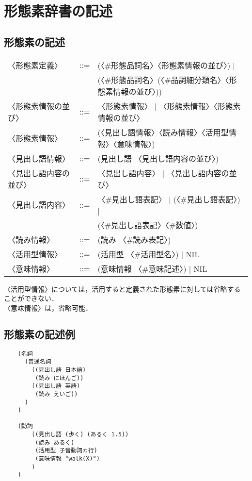 \documentclass[a4j,titlepage]{jarticle}
\begin{document}
\clearpage

\section{形態素辞書の記述}\label{app:goijisho}

\subsection{形態素の記述}

\begin{tt}
\begin{tabular}{lll}
〈形態素定義〉  &::=&(〈\#形態品詞名〉〈形態素情報の並び〉) |                \\
                &   &(〈\#形態品詞名〉(〈\#品詞細分類名〉〈形態素情報の並び〉))\\
〈形態素情報の並び〉&::=&〈形態素情報〉 | 〈形態素情報〉〈形態素情報の並び〉\\
〈形態素情報〉  &::=& (〈見出し語情報〉〈読み情報〉〈活用型情報〉〈意味情報〉)\\
〈見出し語情報〉&::=& (見出し語 〈見出し語内容の並び〉) \\
〈見出し語内容の並び〉&::=&〈見出し語内容〉 | 〈見出し語内容の並び〉\\
〈見出し語内容〉&::=& 〈\#見出し語表記〉 | (〈\#見出し語表記〉)  | \\
                &   &  (〈\#見出し語表記〉〈\#数値〉) \\
〈読み情報〉    &::=& (読み 〈\#読み表記〉) \\
〈活用型情報〉  &::=& (活用型 〈\#活用型名〉) | NIL \\
〈意味情報〉    &::=& (意味情報 〈\#意味記述〉) | NIL
\end{tabular}
\end{tt}

\vspace{2mm}
\noindent
〈活用型情報〉については，活用すると定義された形態素に対しては省略する
ことができない．\\
〈意味情報〉は，省略可能．

\subsection{形態素の記述例}

\begin{verbatim}
    (名詞
      (普通名詞
        ((見出し語 日本語)
         (読み にほんご))
        ((見出し語 英語)
         (読み えいご))
      )
    )

    (動詞
        ((見出し語 (歩く) (あるく 1.5))
         (読み あるく)
         (活用型 子音動詞カ行)
         (意味情報 "walk(X)")
        )
    )
\end{verbatim}
\end{document}
